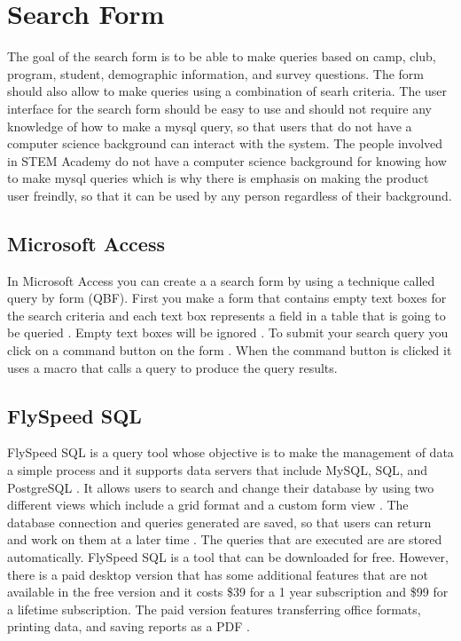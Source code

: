 \documentclass[letterpaper,10pt,serif, draftclsnofoot,onecolumn, compsoc, titlepage]{IEEEtran}
\begin{document}
\section{Search Form}
The goal of the search form is to be able to make queries based on camp, club, program, student, demographic information, and survey questions. The form should also allow to make queries using a combination of searh criteria. The user interface for the search form should be easy to use and should not require any knowledge of how to make a mysql query, so that users that do not have a computer science background can interact with the system. The people involved in STEM Academy do not have a computer science background for knowing how to make mysql queries which is why there is emphasis on making the product user freindly, so that it can be used by any person regardless of their background. 

\subsection{Microsoft Access}
In Microsoft Access you can create a a search form by using a technique called query by form (QBF). First you make a form that contains empty text boxes for the search criteria and each text box represents a field in a table that is going to be queried \cite{Micro}. Empty text boxes will be ignored \cite{Micro}. To submit your search query you click on a command button on the form \cite{Micro}. When the command button is clicked it uses a macro that calls a query to produce the query results. 

\subsection{FlySpeed SQL}
FlySpeed SQL is a query tool whose objective is to make the management of data a simple process and it supports data servers that include MySQL, SQL, and PostgreSQL \cite{Andrew}. It allows users to search and change their database by using two different views which include a grid format and a custom form view \cite{Andrew}.  The database connection and queries generated are saved, so that users can return and work on them at a later time \cite{Fly}. The queries that are executed are are stored automatically\cite{Fly}. FlySpeed SQL is a tool that can be downloaded for free. However, there is a paid desktop version that has some additional features that are not available in the free version and it costs \$39 for a 1 year subscription and \$99 for a lifetime subscription\cite{FlyCost}. The paid version features transferring office formats, printing data, and saving reports as a PDF \cite{Fly}. 
\end{document}
